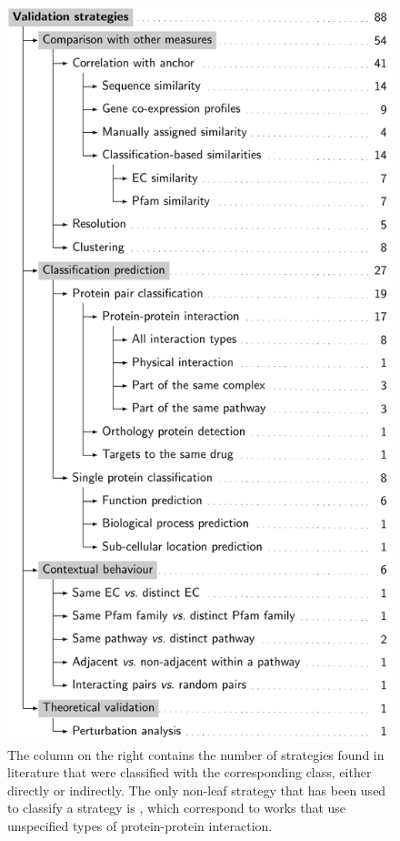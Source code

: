 \begin{figure}
    \centering
    \includegraphics[height=0.8\textheight]{images/hierarchy.pdf}
    \caption[Hierarchy of strategies employed in -based similarity validation]{The column on the right contains the number of strategies found in literature that were classified with the corresponding class, either directly or indirectly. The only non-leaf strategy that has been used to classify a strategy is , which correspond to works that use unspecified types of protein-protein interaction.}
    \label{fig:hierarchy}
\end{figure}

